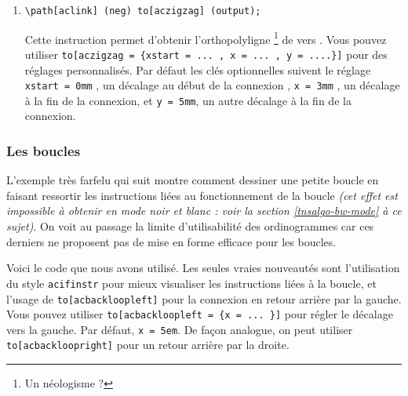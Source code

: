 \documentclass[12pt,a4paper]{article}
\theoremstyle{definition}
\begin{document}
\begin{enumerate}
	\medskip
	\item \verb+\path[aclink] (neg) to[aczigzag] (output);+
	      
	      \smallskip
	      Cette instruction permet d'obtenir \og l'orthopolyligne \fg{} 
	      \footnote{
	          Un néologisme ?
	      }
	      de  vers  .
	      Vous pouvez utiliser \verb+to[aczigzag = {xstart = ... , x = ... , y = ....}]+ pour des réglages personnalisés.
	      Par défaut les clés optionnelles suivent le réglage \verb+xstart = 0mm+ , un décalage au début de la connexion , \verb+x = 3mm+ , un décalage à la fin de la connexion, et \verb+y = 5mm+, un autre décalage à la fin de la connexion.
\end{enumerate}




\subsubsection{Les boucles}

L'exemple très farfelu qui suit montre comment dessiner une petite boucle en faisant ressortir les instructions liées au fonctionnement de la boucle \emph{(cet effet est impossible à obtenir en mode noir et blanc : voir la section \ref{tnsalgo-bw-mode} à ce sujet)}.
On voit au passage la limite d'utilisabilité des ordinogrammes car ces derniers ne proposent pas de mise en forme efficace pour les boucles.


\begin{center}
    \small
    
\end{center}


Voici le code que nous avons utilisé. Les seules vraies nouveautés sont l'utilisation du style \verb+acifinstr+ pour mieux visualiser les instructions liées à la boucle, et l'usage de \verb+to[acbackloopleft]+ pour la connexion en retour arrière par la gauche.
Vous pouvez utiliser \verb+to[acbackloopleft = {x = ... }]+  pour régler le décalage vers la gauche.
Par défaut, \verb+x = 5em+.
De façon analogue, on peut utiliser \verb+to[acbackloopright]+ pour un retour arrière par la droite. 

\medskip

\end{document}

